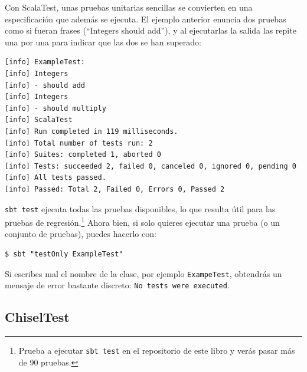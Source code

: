 \documentclass[%
    10pt,
    headinclude, footinclude=false,
    openright, %
    notitlepage,
    cleardoublepage=empty,
    headsepline,
    numbers=noenddot,
    bibliography=totoc, index=totoc,
    ]{scrbook}
\newcommand{\code}[1]{{\lstinline[basicstyle=\small\ttfamily]{#1}}}
\newcommand{\codefoot}[1]{{\lstinline[basicstyle=\footnotesize\ttfamily]{#1}}}
\newcommand{\myref}[2]{\href{#1}{#2}}
\renewcommand{\myref}[2]{{#2}{\footnote{\url{#1}}}}
\begin{document}
Con ScalaTest, unas pruebas unitarias sencillas se convierten en una especificación que además se
ejecuta. El ejemplo anterior enuncia dos pruebas como si fueran frases (``Integers should add''), y al
ejecutarlas la salida las repite una por una para indicar que las dos se han superado:

\begin{verbatim}
[info] ExampleTest:
[info] Integers
[info] - should add
[info] Integers
[info] - should multiply
[info] ScalaTest
[info] Run completed in 119 milliseconds.
[info] Total number of tests run: 2
[info] Suites: completed 1, aborted 0
[info] Tests: succeeded 2, failed 0, canceled 0, ignored 0, pending 0
[info] All tests passed.
[info] Passed: Total 2, Failed 0, Errors 0, Passed 2
\end{verbatim}



\code{sbt test} ejecuta todas las pruebas disponibles, lo que resulta útil para las pruebas de
regresión.\footnote{Prueba a ejecutar \codefoot{sbt test} en el repositorio de este libro y verás
pasar más de 90 pruebas.}
Ahora bien, si solo quieres ejecutar una prueba (o un conjunto de pruebas), puedes hacerlo con:

\begin{verbatim}
$ sbt "testOnly ExampleTest"
\end{verbatim}


\noindent Si escribes mal el nombre de la clase, por ejemplo \code{ExampeTest},
obtendrás un mensaje de error bastante discreto: \code{No tests were executed}.

\subsection{ChiselTest}


\end{document}
